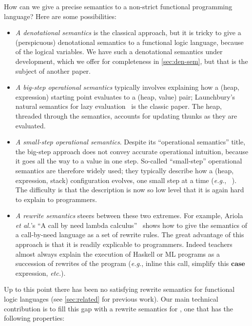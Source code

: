 \documentclass[acmsmall,review,anonymous,dvipsnames]{acmart}
\newcommand{\eg}{\emph{e.g.}}
\newcommand{\etc}{\emph{etc.}}
\newcommand{\etal}{\emph{et al.}}
\begin{document}
How can we give a precise semantics to a non-strict functional
programming language?  Here are some possibilities:
\begin{itemize}
\item \emph{A denotational semantics} is the classical approach,
  but it is tricky to give a (perspicuous) denotational semantics to a functional logic language,
  because of the logical variables.  We have such a denotational semantics under development,
  which we offer for completeness in \cref{sec:den-sem}, but that is the subject of another paper.
\item \emph{A big-step operational semantics} typically involves explaining how a (heap, expression) starting point
  evaluates to a (heap, value) pair; Launchbury's natural semantics for lazy evaluation~\cite{launchbury:natural} is the classic paper.  The heap, threaded through the semantics, accounts for updating thunks as they are evaluated.
\item \emph{A small-step operational semantics}. Despite its ``operational semantics'' title, the big-step approach
  does not convey accurate operational intuition, because it goes all the way to a value
  in one step. So-called ``small-step'' operational semantics are therefore widely used;
  they typically describe how a (heap, expression, stack) configuration evolves, one small
  step at a time ({\eg}, ~\cite{pj:stg-machine}).
  The difficulty is that the description is now so low level that it is again hard to explain to programmers.
\item \emph{A rewrite semantics} steers between these two extremes.
  For example, Ariola {\etal}'s ``A call by need lambda calculus''~\cite{ariola:call-by-need} shows how
  to give the semantics of a call-by-need language as a set of rewrite rules. The great
  advantage of this approach is that it is readily explicable to programmers.
  Indeed teachers almost always explain the execution of Haskell or ML programs as a succession of rewrites
 of the program ({\eg}, inline this call, simplify this \ensuremath{\textbf{case}} expression, \etc).
\end{itemize}
Up to this point there has been no satisfying rewrite semantics for functional logic languages
(see \cref{sec:related} for previous work).
Our main technical contribution is to fill this gap with a rewrite semantics for \versecalc{}, one that
has the following properties:
\end{document}
